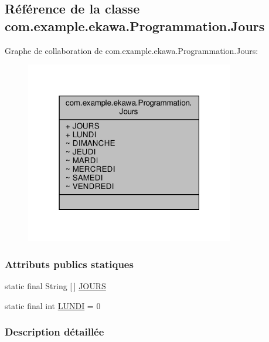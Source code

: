 \hypertarget{classcom_1_1example_1_1ekawa_1_1_programmation_1_1_jours}{}\subsection{Référence de la classe com.\+example.\+ekawa.\+Programmation.\+Jours}
\label{classcom_1_1example_1_1ekawa_1_1_programmation_1_1_jours}


Graphe de collaboration de com.\+example.\+ekawa.\+Programmation.\+Jours\+:\nopagebreak
\begin{figure}[H]
\begin{center}
\leavevmode
\includegraphics[width=259pt]{classcom_1_1example_1_1ekawa_1_1_programmation_1_1_jours__coll__graph}
\end{center}
\end{figure}
\subsubsection*{Attributs publics statiques}
\begin{DoxyCompactItemize}
\item 
static final String \mbox{[}$\,$\mbox{]} \hyperlink{classcom_1_1example_1_1ekawa_1_1_programmation_1_1_jours_a45d873d90f82a1cdeabeba21a37b7aba}{J\+O\+U\+RS}
\item 
static final int \hyperlink{classcom_1_1example_1_1ekawa_1_1_programmation_1_1_jours_af73668910813425a74baccc5940153ef}{L\+U\+N\+DI} = 0
\end{DoxyCompactItemize}


\subsubsection{Description détaillée}


